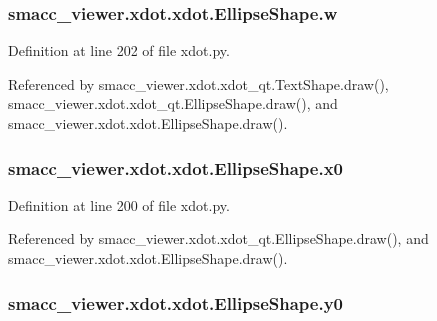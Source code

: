 \subsubsection[{\texorpdfstring{w}{w}}]{\setlength{\rightskip}{0pt plus 5cm}smacc\+\_\+viewer.\+xdot.\+xdot.\+Ellipse\+Shape.\+w}\hypertarget{classsmacc__viewer_1_1xdot_1_1xdot_1_1EllipseShape_af68f2823ce09ed7643269d10b0bbc886}{}\label{classsmacc__viewer_1_1xdot_1_1xdot_1_1EllipseShape_af68f2823ce09ed7643269d10b0bbc886}


Definition at line 202 of file xdot.\+py.



Referenced by smacc\+\_\+viewer.\+xdot.\+xdot\+\_\+qt.\+Text\+Shape.\+draw(), smacc\+\_\+viewer.\+xdot.\+xdot\+\_\+qt.\+Ellipse\+Shape.\+draw(), and smacc\+\_\+viewer.\+xdot.\+xdot.\+Ellipse\+Shape.\+draw().

\subsubsection[{\texorpdfstring{x0}{x0}}]{\setlength{\rightskip}{0pt plus 5cm}smacc\+\_\+viewer.\+xdot.\+xdot.\+Ellipse\+Shape.\+x0}\hypertarget{classsmacc__viewer_1_1xdot_1_1xdot_1_1EllipseShape_a07cb1e682c863ae342c17263cd47d1c5}{}\label{classsmacc__viewer_1_1xdot_1_1xdot_1_1EllipseShape_a07cb1e682c863ae342c17263cd47d1c5}


Definition at line 200 of file xdot.\+py.



Referenced by smacc\+\_\+viewer.\+xdot.\+xdot\+\_\+qt.\+Ellipse\+Shape.\+draw(), and smacc\+\_\+viewer.\+xdot.\+xdot.\+Ellipse\+Shape.\+draw().

\subsubsection[{\texorpdfstring{y0}{y0}}]{\setlength{\rightskip}{0pt plus 5cm}smacc\+\_\+viewer.\+xdot.\+xdot.\+Ellipse\+Shape.\+y0}\hypertarget{classsmacc__viewer_1_1xdot_1_1xdot_1_1EllipseShape_ac5b1c7c837f519afa1c005305ee823cb}{}\label{classsmacc__viewer_1_1xdot_1_1xdot_1_1EllipseShape_ac5b1c7c837f519afa1c005305ee823cb}



